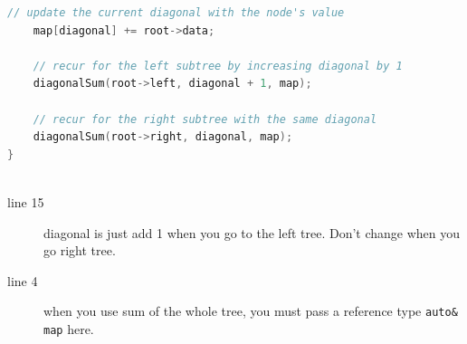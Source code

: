 \documentclass[a4paper,11pt,twoside]{book}
\begin{document}
\begin{itemize}
\begin{lstlisting}[frame=single, language=c++]
	// update the current diagonal with the node's value
	map[diagonal] += root->data;
	
	// recur for the left subtree by increasing diagonal by 1
	diagonalSum(root->left, diagonal + 1, map);
	
	// recur for the right subtree with the same diagonal
	diagonalSum(root->right, diagonal, map);
}
	
\end{lstlisting}
\begin{description}
	\item[line 15] diagonal is just add 1 when you go to the left tree. Don't change when you go right tree. 
	\item[line 4] when you use sum of the whole tree, you must pass a reference type \texttt{auto\& map} here. 
\end{description}	

\end{itemize}

 
\end{document}
